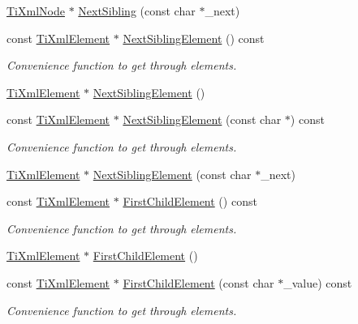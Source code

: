 \begin{DoxyCompactItemize}
\hyperlink{classTiXmlNode}{TiXmlNode} $\ast$ \hyperlink{classTiXmlNode_a4080bc5cc8a5c139e7cf308669e850fc}{NextSibling} (const char $\ast$\_\-next)
\item 
const \hyperlink{classTiXmlElement}{TiXmlElement} $\ast$ \hyperlink{classTiXmlNode_a7667217e269e0da01d1f82aee94d1a3d}{NextSiblingElement} () const 
\begin{DoxyCompactList}\small\item\em Convenience function to get through elements. \item\end{DoxyCompactList}\item 
\hyperlink{classTiXmlElement}{TiXmlElement} $\ast$ \hyperlink{classTiXmlNode_a1b211cb5034655a04358e0e2f6fc5010}{NextSiblingElement} ()
\item 
const \hyperlink{classTiXmlElement}{TiXmlElement} $\ast$ \hyperlink{classTiXmlNode_a3d7897999f99cf4870dd59df6331d7ff}{NextSiblingElement} (const char $\ast$) const 
\begin{DoxyCompactList}\small\item\em Convenience function to get through elements. \item\end{DoxyCompactList}\item 
\hyperlink{classTiXmlElement}{TiXmlElement} $\ast$ \hyperlink{classTiXmlNode_a6e1ac6b800e18049bc75e9f8e63a8e5f}{NextSiblingElement} (const char $\ast$\_\-next)
\item 
const \hyperlink{classTiXmlElement}{TiXmlElement} $\ast$ \hyperlink{classTiXmlNode_ab1f8d8e70d88aea4c5efedfe00862d55}{FirstChildElement} () const 
\begin{DoxyCompactList}\small\item\em Convenience function to get through elements. \item\end{DoxyCompactList}\item 
\hyperlink{classTiXmlElement}{TiXmlElement} $\ast$ \hyperlink{classTiXmlNode_aa0fecff1f3866ab33a8a25506e95db1d}{FirstChildElement} ()
\item 
const \hyperlink{classTiXmlElement}{TiXmlElement} $\ast$ \hyperlink{classTiXmlNode_a0ec361bfef1cf1978d060295f597e0d9}{FirstChildElement} (const char $\ast$\_\-value) const 
\begin{DoxyCompactList}\small\item\em Convenience function to get through elements. \item\end{DoxyCompactList}\item 

\end{DoxyCompactItemize}
